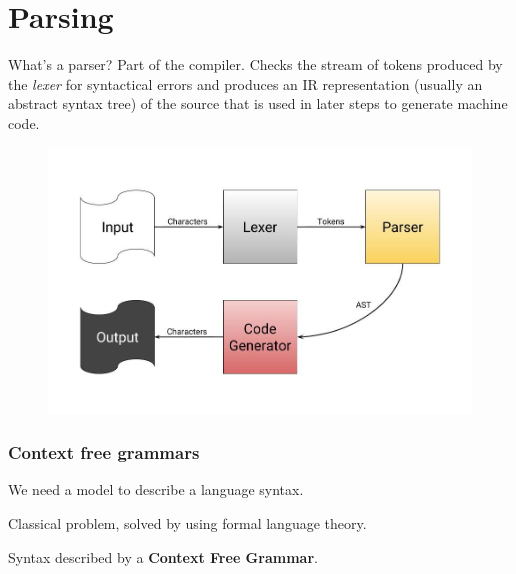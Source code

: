 \section{Parsing}
\begin{frame}
    \begin{block}{What's a parser?}
        Part of the compiler.
        Checks the stream of tokens produced by the \emph{lexer} for syntactical errors
        and produces an IR representation (usually an abstract syntax tree) of the source 
        that is used in later steps to generate machine code.
    \end{block}
    \begin{figure}
        \includegraphics[width=\textwidth]{img/parser.jpg}
    \end{figure}
\end{frame}
\begin{frame}
    \frametitle{Context free grammars}
    
    \begin{block}{}We need a model to describe a language syntax.\end{block}
    \pause
    \begin{block}{}Classical problem, solved by using formal language theory.\end{block}
    \pause
    \begin{block}{}{Syntax described by a \textbf{Context Free Grammar}.}\end{block}

\end{frame}
